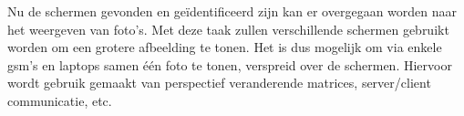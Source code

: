 Nu de schermen gevonden en geïdentificeerd zijn kan er overgegaan worden naar het weergeven van foto's. Met deze taak zullen verschillende schermen gebruikt worden om een grotere afbeelding te tonen. Het is dus mogelijk om via enkele gsm's en laptops samen één foto te tonen, verspreid over de schermen. Hiervoor wordt gebruik gemaakt van perspectief veranderende matrices, server/client communicatie, etc.